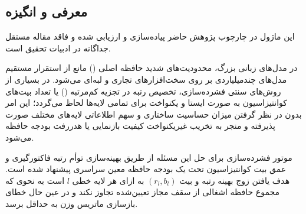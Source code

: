 \subsection{معرفی و انگیزه}
این ماژول در چارچوب پژوهش حاضر پیاده‌سازی و ارزیابی شده و فاقد مقاله مستقل جداگانه در ادبیات تحقیق است.

در مدل‌های زبانی بزرگ، محدودیت‌های شدید حافظه اصلی () مانع از استقرار مستقیم مدل‌های چندمیلیاردی بر روی سخت‌افزارهای تجاری و لبه‌ای می‌شود. در بسیاری از روش‌های سنتی فشرده‌سازی، تخصیص رتبه در تجزیه کم‌مرتبه () یا تعداد بیت‌های کوانتیزاسیون به صورت ایستا و یکنواخت برای تمامی لایه‌ها لحاظ می‌گردد؛ این امر بدون در نظر گرفتن میزان حساسیت ساختاری و سهم اطلاعاتی لایه‌های مختلف صورت پذیرفته و منجر به تخریب غیریکنواخت کیفیت بازنمایی یا هدررفت بودجه حافظه می‌شود.

موتور فشرده‌سازی  برای حل این مسئله از طریق بهینه‌سازی توأم رتبه فاکتورگیری و عمق بیت کوانتیزاسیون تحت یک بودجه حافظه معین سراسری پیشنهاد شده است. هدف  یافتن زوج بهینه رتبه و بیت $(r_l, b_l)$ به ازای هر لایه خطی $l$ است به نحوی که مجموع حافظه اشغالی از سقف مجاز تعیین‌شده تجاوز نکند و در عین حال خطای بازسازی ماتریس وزن به حداقل برسد.
